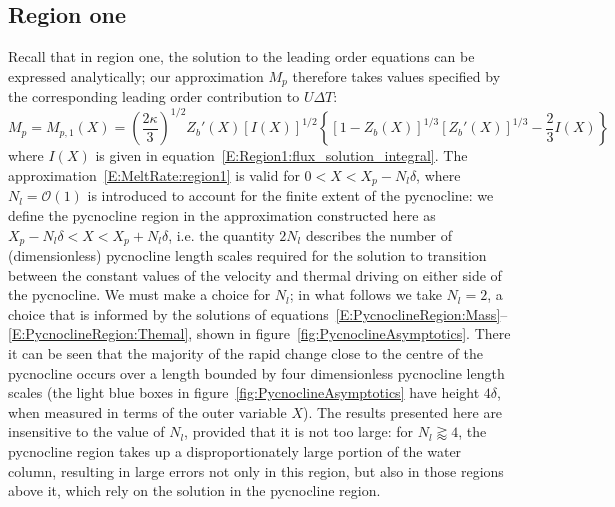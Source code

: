\documentclass[openacc]{rsproca_new}%
\newcommand{\order}[1]{\mathcal{O}(#1)}
\newcommand{\blue}[1]{{\color{blue} #1}}
\newcommand{\lt}{\delta} %
\begin{document}
\subsection{Region one}
Recall that in region one, the solution to the leading order equations can be expressed analytically; our approximation $M_p$ therefore takes values specified by the corresponding leading order contribution to $U\Delta T$:
\begin{equation}\label{E:MeltRate:region1}
M_{p} = M_{p,1}(X) = \left(\frac{2\kappa}{3}\right)^{1/2}Z_b'(X)\left[I(X)\right]^{1/2}\left\{\left[1 - Z_b(X)\right]^{1/3}\left[Z_b'(X)\right]^{1/3} - \frac{2}{3}I(X) \right\} %
\end{equation}
where $I(X)$ is given in equation~\eqref{E:Region1:flux_solution_integral}. The approximation~\eqref{E:MeltRate:region1} is valid for $0 < X < X_p - N_l \lt $, where $N_l = \order{1}$ is introduced to account for the finite extent of the pycnocline: we define the pycnocline region in  the approximation constructed here as $X_p - N_l \lt < X < X_p + N_l \lt$, i.e. the quantity $2 N_l$ describes the number of (dimensionless) pycnocline length scales required for the solution to transition between the constant values of the velocity and thermal driving on either side of the pycnocline.  We must make a choice for $N_l$; in what follows we take $N_l = 2$, a choice that is informed by the solutions of equations~\eqref{E:PycnoclineRegion:Mass}--\eqref{E:PycnoclineRegion:Themal}, shown in figure~\ref{fig:PycnoclineAsymptotics}. There it can be seen that the majority of the rapid change close to the centre of the pycnocline occurs over a length bounded by four dimensionless pycnocline length scales (the light blue boxes in figure~\ref{fig:PycnoclineAsymptotics} have height $4\lt$, when measured in terms of the outer variable $X$). \blue{The results presented here are insensitive to the value of $N_l$, provided that it is not too large: for $N_l \gtrapprox 4$, the pycnocline region takes up a disproportionately large portion of the water column, resulting in large errors not only in this region, but also in those regions above it, which rely on the solution in the pycnocline region.}
\end{document}
